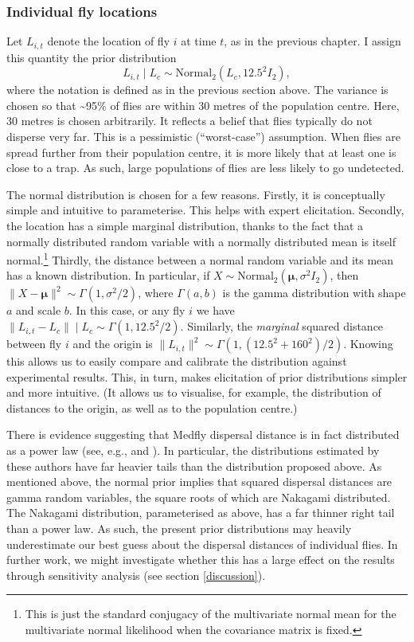 \documentclass[
  oneside]{book}
\begin{document}
\hypertarget{individual-fly-locations}{%
\subsubsection*{Individual fly locations}\label{individual-fly-locations}}

Let \(L_{i, t}\) denote the location of fly \(i\) at time \(t\), as in the previous chapter. I assign this quantity the prior distribution \[L_{i, t} \mid L_c \sim \mathrm {Normal}_2 (L_c, 12.5^2 I_2),\] where the notation is defined as in the previous section above. The variance is chosen so that \textasciitilde95\% of flies are within 30 metres of the population centre. Here, 30 metres is chosen arbitrarily. It reflects a belief that flies typically do not disperse very far. This is a pessimistic (``worst-case'') assumption. When flies are spread further from their population centre, it is more likely that at least one is close to a trap. As such, large populations of flies are less likely to go undetected.

The normal distribution is chosen for a few reasons. Firstly, it is conceptually simple and intuitive to parameterise. This helps with expert elicitation. Secondly, the location has a simple marginal distribution, thanks to the fact that a normally distributed random variable with a normally distributed mean is itself normal.\footnote{This is just the standard conjugacy of the multivariate normal mean for the multivariate normal likelihood when the covariance matrix is fixed.} Thirdly, the distance between a normal random variable and its mean has a known distribution. In particular, if \(X \sim \mathrm{Normal}_2(\pmb \mu, \sigma^2 I_2)\), then \(\lVert X - \pmb \mu \rVert^2 \sim \Gamma(1, \sigma^2/2)\), where \(\Gamma(a, b)\) is the gamma distribution with shape \(a\) and scale \(b\). In this case, or any fly \(i\) we have \(\lVert L_{i,t} - L_c \rVert \mid L_c \sim \Gamma(1, 12.5^2/2)\). Similarly, the \emph{marginal} squared distance between fly \(i\) and the origin is \(\lVert L_{i, t} \rVert^2 \sim \Gamma(1, (12.5^2 + 160^2) / 2)\). Knowing this allows us to easily compare and calibrate the distribution against experimental results. This, in turn, makes elicitation of prior distributions simpler and more intuitive. (It allows us to visualise, for example, the distribution of distances to the origin, as well as to the population centre.)

There is evidence suggesting that Medfly dispersal distance is in fact distributed as a power law (see, e.g., \citet{meats2005} and \citet{plant1991}). In particular, the distributions estimated by these authors have far heavier tails than the distribution proposed above. As mentioned above, the normal prior implies that squared dispersal distances are gamma random variables, the square roots of which are Nakagami distributed. The Nakagami distribution, parameterised as above, has a far thinner right tail than a power law. As such, the present prior distributions may heavily underestimate our best guess about the dispersal distances of individual flies. In further work, we might investigate whether this has a large effect on the results through sensitivity analysis (see section \ref{discussion}).
\end{document}
